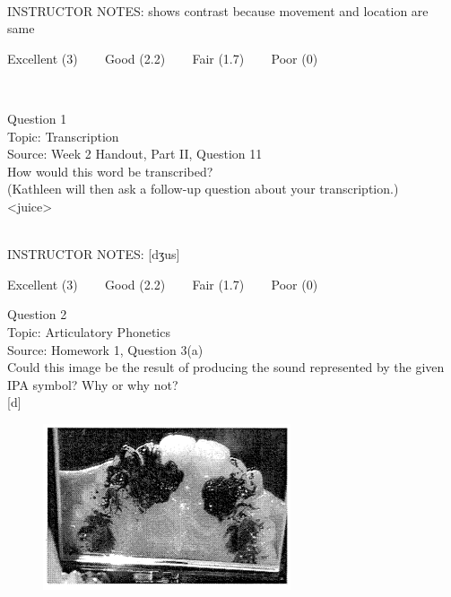 \documentclass[12pt]{article}
\begin{document}
~\\
INSTRUCTOR NOTES: shows contrast because movement and location are same


\vfill
Excellent (3) ~~~ Good (2.2) ~~~ Fair (1.7) ~~~ Poor (0)
\newpage

\begin{center}
\textbf{{\color{red}{\HUGE END OF EXAM}}}\\

\end{center}
\newpage

\begin{center}
\textbf{{\color{blue}{\HUGE START OF EXAM\\}}}

\textbf{{\color{blue}{\HUGE Student ID: 74752\\}}}

\textbf{{\color{blue}{\HUGE \\}}}

\end{center}
\newpage

{\large Question 1}\\

Topic: Transcription\\
Source: Week 2 Handout, Part II, Question 11\\

How would this word be transcribed?\\ (Kathleen will then ask a follow-up question about your transcription.)\\

<juice>


~\\
INSTRUCTOR NOTES: [dʒus]


\vfill
Excellent (3) ~~~ Good (2.2) ~~~ Fair (1.7) ~~~ Poor (0)
\newpage

{\large Question 2}\\

Topic: Articulatory Phonetics\\
Source: Homework 1, Question 3(a)\\

Could this image be the result of producing the sound represented by the given IPA symbol? Why or why not?\\

{[d]}

\begin{figure}[H]
\includegraphics{../images/staticpalatography_fricative.png}
\end{figure}
\end{document}
